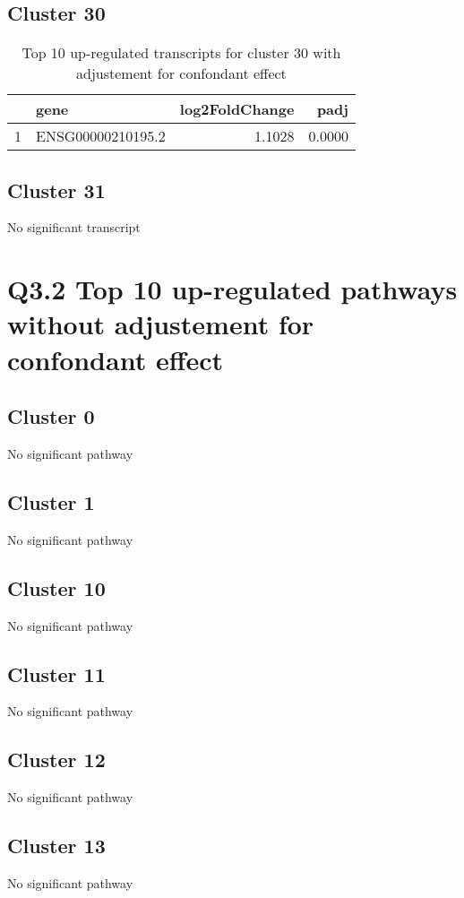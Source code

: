 \documentclass{article}
\begin{document}
\subsection{Cluster 30 }
\begin{table}[H]
\centering
\begin{tabular}{rlrr}
  \hline
 & gene & log2FoldChange & padj \\ 
  \hline
1 & ENSG00000210195.2 & 1.1028 & 0.0000 \\ 
   \hline
\end{tabular}
\caption{Top 10 up-regulated transcripts for cluster 30 with adjustement for confondant effect} 
\label{tab:q3_1_conf_30}
\end{table}
\subsection{Cluster 31 }
No significant transcript
\section{Q3.2 Top 10 up-regulated pathways without adjustement for confondant effect}
\subsection{Cluster 0 }
No significant pathway
\subsection{Cluster 1 }
No significant pathway
\subsection{Cluster 10 }
No significant pathway
\subsection{Cluster 11 }
No significant pathway
\subsection{Cluster 12 }
No significant pathway
\subsection{Cluster 13 }
No significant pathway
\end{document}
